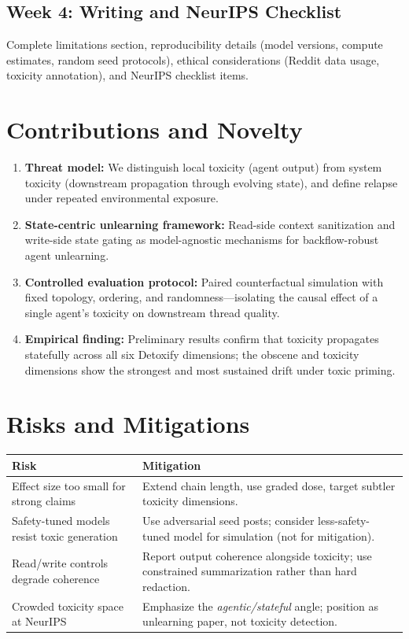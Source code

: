 \documentclass[11pt]{article}
\begin{document}
\subsection{Week 4: Writing and NeurIPS Checklist}

Complete limitations section, reproducibility details (model versions, compute estimates,
random seed protocols), ethical considerations (Reddit data usage, toxicity annotation),
and NeurIPS checklist items.

\section{Contributions and Novelty}

\begin{enumerate}[noitemsep]
  \item \textbf{Threat model:} We distinguish local toxicity (agent output) from system
  toxicity (downstream propagation through evolving state), and define relapse under
  repeated environmental exposure.
  \item \textbf{State-centric unlearning framework:} Read-side context sanitization and
  write-side state gating as model-agnostic mechanisms for backflow-robust agent unlearning.
  \item \textbf{Controlled evaluation protocol:} Paired counterfactual simulation with
  fixed topology, ordering, and randomness---isolating the causal effect of a single
  agent's toxicity on downstream thread quality.
  \item \textbf{Empirical finding:} Preliminary results confirm that toxicity propagates
  statefully across all six Detoxify dimensions; the obscene and toxicity dimensions show
  the strongest and most sustained drift under toxic priming.
\end{enumerate}

\section{Risks and Mitigations}

\begin{tabular}{p{5.5cm}p{8.5cm}}
\toprule
\textbf{Risk} & \textbf{Mitigation} \\
\midrule
Effect size too small for strong claims & Extend chain length, use graded dose, target subtler toxicity dimensions. \\
Safety-tuned models resist toxic generation & Use adversarial seed posts; consider less-safety-tuned model for simulation (not for mitigation). \\
Read/write controls degrade coherence & Report output coherence alongside toxicity; use constrained summarization rather than hard redaction. \\
Crowded toxicity space at NeurIPS & Emphasize the \emph{agentic/stateful} angle; position as unlearning paper, not toxicity detection. \\
\bottomrule
\end{tabular}
\end{document}

